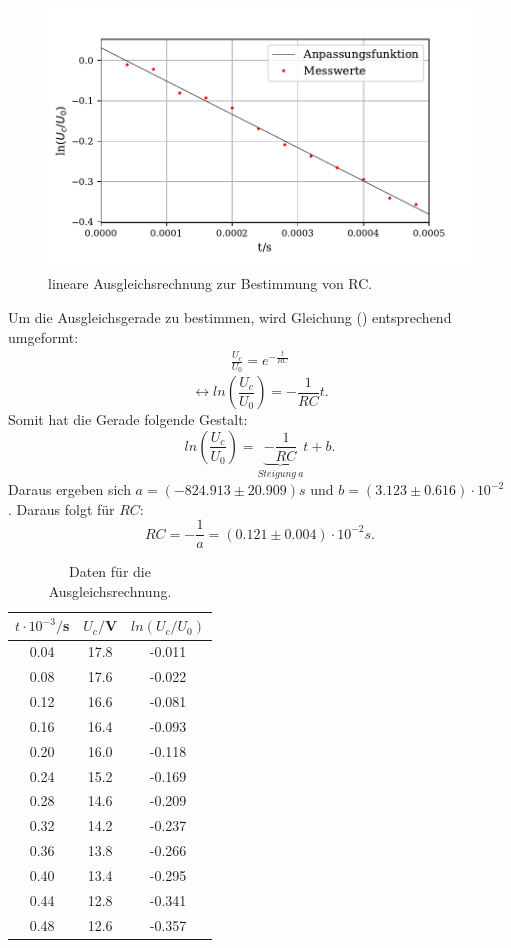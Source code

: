 \begin{figure}
  \centering
  \includegraphics{plot1.pdf}
  \caption{lineare Ausgleichsrechnung zur Bestimmung von RC.}
  \label{fig:plot}
\end{figure}
\noindent Um die Ausgleichsgerade zu bestimmen, wird Gleichung () entsprechend umgeformt:
\begin{align*}
    \frac{U_c}{U_0} = e^{-\frac{t}{RC}}
\end{align*}
\begin{equation*}
    \leftrightarrow ln{(\frac{U_c}{U_0})} = -\frac{1}{RC}t .
\end{equation*}
Somit hat die Gerade folgende Gestalt:
\begin{equation}
    ln{(\frac{U_c}{U_0})} = \underbrace{-\frac{1}{RC}}_{Steigung \: a}t + b .
\end{equation}
Daraus ergeben sich $a = (-824.913 \pm 20.909) s$ und $b = (3.123 \pm 0.616) \cdot 10^{-2} $ .
Daraus folgt für $RC$:
\begin{equation*}
    RC = -\frac{1}{a} = (0.121 \pm 0.004)\cdot 10^{-2} s.
\end{equation*}

\begin{table}[H]
  \centering
  \caption{Daten für die Ausgleichsrechnung.}
  \label{tab:Parameter}
  \begin{tabular}{c c c}
    \toprule
    $t\cdot 10^{-3}/$s & $U_c/$V & $ln(U_c/U_0)$  \\
    \bottomrule
     0.04 & 17.8  & -0.011 \\
     0.08 & 17.6  & -0.022\\
     0.12& 16.6  & -0.081\\
     0.16& 16.4  & -0.093\\
     0.20 & 16.0  &-0.118\\
     0.24 & 15.2  &-0.169\\
     0.28 & 14.6  &-0.209\\
     0.32& 14.2 & -0.237\\
     0.36& 13.8  & -0.266\\
     0.40& 13.4  & -0.295\\
     0.44& 12.8  & -0.341\\
     0.48& 12.6  & -0.357\\
     
    \bottomrule
  \end{tabular}
\end{table}

